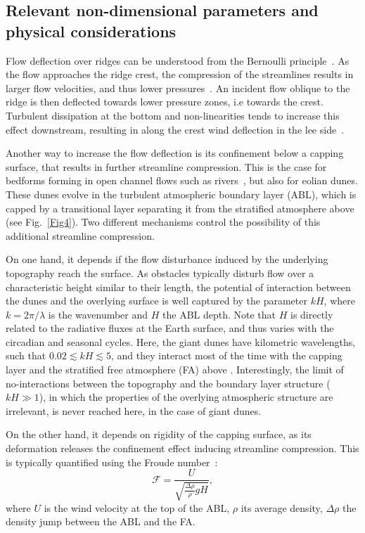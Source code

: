   \subsection{Relevant non-dimensional parameters and physical considerations}
  \label{theoretical_framework}

  Flow deflection over ridges can be understood from the Bernoulli principle~\citep{Hesp2015}. As the flow approaches the ridge crest, the compression of the streamlines results in larger flow velocities, and thus lower pressures~\citep{Rubin1987}. An incident flow oblique to the ridge is then deflected towards lower pressure zones, i.e towards the crest. Turbulent dissipation at the bottom and non-linearities tends to increase this effect downstream, resulting in along the crest wind deflection in the lee side~\citep{Hesp2015, Gadal2019}.

  Another way to increase the flow deflection is its confinement below a capping surface, that results in further streamline compression. This is the case for bedforms forming in open channel flows such as rivers~\citep{Fourriere2010, Unsworth2018}, but also for eolian dunes. These dunes evolve in the turbulent atmospheric boundary layer (ABL), which is capped by a transitional layer separating it from the stratified atmosphere above (see Fig.~\ref{Fig4}). Two different mechanisms control the possibility of this additional streamline compression.

  On one hand, it depends if the flow disturbance induced by the underlying topography reach the surface. As obstacles typically disturb flow over a characteristic height similar to their length, the potential of interaction between the dunes and the overlying surface is well captured by the parameter $k H$, where $k = 2\pi/\lambda$ is the wavenumber and $H$ the ABL depth. Note that $H$ is directly related to the radiative fluxes at the Earth surface, and thus varies with the circadian and seasonal cycles. Here, the giant dunes have kilometric wavelengths, such that $0.02 \lesssim k H \lesssim 5$, and they interact most of the time with the capping layer and the stratified free atmosphere (FA) above \citep{andreotti2009}. Interestingly, the limit of no-interactions between the topography and the boundary layer structure ($k H \gg 1$), in which the properties of the overlying atmospheric structure are irrelevant, is never reached here, in the case of giant dunes.

  On the other hand, it depends on rigidity of the capping surface, as its deformation releases the confinement effect inducing streamline compression. This is typically quantified using the Froude number~\citep{Vosper2004, Stull2006, Sheridan2006, Hunt2006, Jiang2014}:
  \begin{equation}
        \mathcal{F} = \displaystyle\frac{U}{\sqrt{\displaystyle\frac{\Delta\rho}{\rho}gH}},
  \end{equation}
  where $U$ is the wind velocity at the top of the ABL, $\rho$ its average density, $\Delta\rho$ the density jump between the ABL and the FA.



